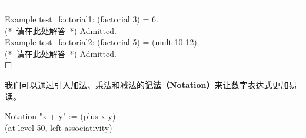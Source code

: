 \documentclass[utf8]{ctexart}
\begin{document}
\begin{center}\rule{0.5\linewidth}{\linethickness}\end{center}

{Example} {test\_factorial1}: ({factorial} 3) = 6.\\
{(*~请在此处解答~*)} {Admitted}.\\
{Example} {test\_factorial2}: ({factorial} 5) = ({mult} 10 12).\\
{(*~请在此处解答~*)} {Admitted}.\\

{☐}

我们可以通过引入加法、乘法和减法的\textbf{记法（Notation）}来让数字表达式更加易读。

{Notation} "x + y" := ({plus} {x} {y})\\
\hspace*{0.333em}\hspace*{0.333em}\hspace*{0.333em}\hspace*{0.333em}\hspace*{0.333em}\hspace*{0.333em}\hspace*{0.333em}\hspace*{0.333em}\hspace*{0.333em}\hspace*{0.333em}\hspace*{0.333em}\hspace*{0.333em}\hspace*{0.333em}\hspace*{0.333em}\hspace*{0.333em}\hspace*{0.333em}\hspace*{0.333em}\hspace*{0.333em}\hspace*{0.333em}\hspace*{0.333em}\hspace*{0.333em}\hspace*{0.333em}\hspace*{0.333em}({at}
{level} 50, {left} {associativity})\\
\end{document}
